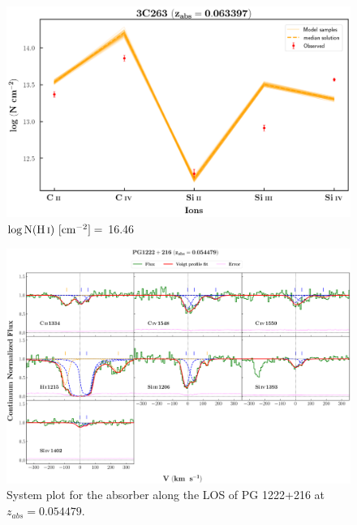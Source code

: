   \newpage 
  
  \begin{figure}[!h]
      \centering
      \includegraphics[width=0.9\linewidth]{Ionisation-Modelling-Plots/3c263-z=0.063397-compIV_logZ=-1.png}
      \caption{$\log \text{N}(\ion{H}{i}) \ [\text{cm}^{-2}]=$ 16.46}
  \end{figure}
  
  
  
  \newpage
  
  \begin{landscape}
  
  \begin{figure}
      \centering
      \vspace{-20mm}
      \hspace*{-35mm}
      \includegraphics[width=1.25\linewidth]{System-Plots/PG1222+216_z=0.054479_sys_plot.png}
      \caption{System plot for the absorber along the LOS of PG 1222+216 at $z_{abs} = 0.054479$. }
  \end{figure}
  
  \end{landscape}
  
